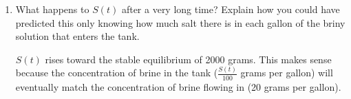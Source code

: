 \documentclass[10pt]{article}
\newenvironment{red}{\color{red}}{\ignorespacesafterend}
\begin{document}
\begin{enumerate}[leftmargin=0pt]
\begin{enumerate}
    \begin{red}
        Let's begin by separating and solving. I'm choosing to leave the $\frac{1}{100}$ on the right.
        \begin{align*}
            \dfrac{dS}{dt} &= \dfrac{1}{100}\left(6000 - 3S\right) \\
            \int \dfrac{1}{6000-3S} \ dS &= \int \dfrac{1}{100}\ dt \\
            -\dfrac{1}{3}\ln(6000 - 3S) &= \dfrac{1}{100}t + C \\
            \ln(6000 - 3S) &= -\dfrac{3}{100}t + C \\
            6000 - 3S &= C\cdot \exp\left(-\tfrac{3}{100}t\right) \\
            S(t) &= 2000 - C\cdot \exp\left(-\tfrac{3}{100}t\right) \\
            0 = S(0) &= 2000 - C\cdot \exp\left(-\tfrac{3}{100}\cdot 0\right) \\
            C &= 2000 \\
            S(t) &= 2000 - 2000\cdot \exp\left(-\tfrac{3}{100}t\right)
        \end{align*}
    \end{red}
    \item What happens to $S(t)$ after a very long time? Explain how you could have predicted this only knowing how much salt there is in each gallon of the briny solution that enters the tank.

    \begin{red}
        $S(t)$ rises toward the stable equilibrium of 2000 grams. This makes sense because the concentration of brine in the tank ($\tfrac{S(t)}{100}$ grams per gallon) will eventually match the concentration of brine flowing in (20 grams per gallon).
    \end{red}
\end{enumerate}

\end{enumerate}
\end{document}
